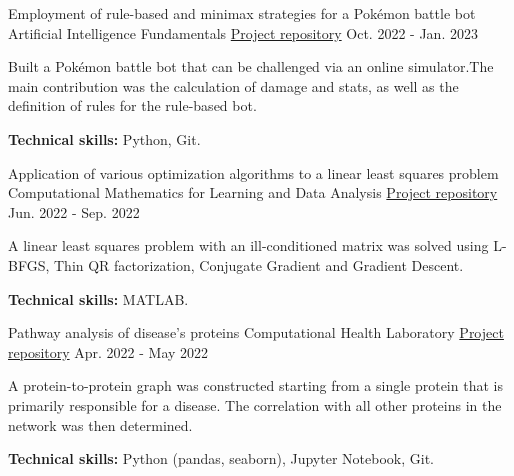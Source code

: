 

\begin{cventries}

\cventry
{Employment of rule-based and minimax strategies for a Pokémon battle bot} %
{Artificial Intelligence Fundamentals} %
{\href{https://github.com/nikodallanoce/PokeBOT}{\faGithubSquare Project repository}} %
{Oct. 2022 - Jan. 2023} %
{
    \begin{cvitems}
        \item{Built a Pokémon battle bot that can be challenged via an online simulator.The main contribution was the calculation of damage and stats, as well as the definition of rules for the rule-based bot.}
        \item{\textbf{Technical skills:} Python, Git.}
    \end{cvitems}
}

\cventry
{Application of various optimization algorithms to a linear least squares problem} %
{Computational Mathematics for Learning and Data Analysis} %
{\href{https://github.com/nikodallanoce/ComputationalMathematics}{\faGithubSquare Project repository}} %
{Jun. 2022 - Sep. 2022} %
{
    \begin{cvitems}
        \item{A linear least squares problem with an ill-conditioned matrix was solved using L-BFGS, Thin QR factorization, Conjugate Gradient and Gradient Descent.}
        \item{\textbf{Technical skills:} MATLAB.}
    \end{cvitems}
}

\cventry
{Pathway analysis of disease's proteins} %
{Computational Health Laboratory} %
{\href{https://github.com/nikodallanoce/ComputationalHealthLaboratory}{\faGithubSquare Project repository}} %
{Apr. 2022 - May 2022} %
{
    \begin{cvitems}
        \item{A protein-to-protein graph was constructed starting from a single protein that is primarily responsible for a disease. The correlation with all other proteins in the network was then determined.}
        \item{\textbf{Technical skills:} Python (pandas, seaborn), Jupyter Notebook, Git.}
    \end{cvitems}
}


\end{cventries}
